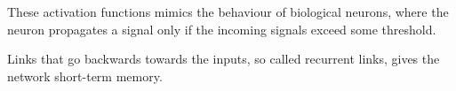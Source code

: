 These activation functions mimics the behaviour of biological neurons, where the neuron propagates
a signal only if the incoming signals exceed some threshold.


Links that go backwards towards the inputs, so called recurrent links, gives the network short-term memory.

